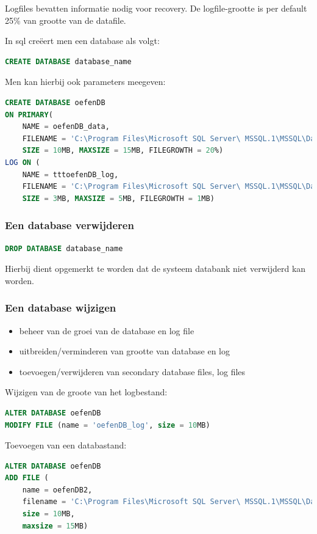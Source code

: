 \documentclass[a4paper,12pt]{article}
\begin{document}
Logfiles bevatten informatie nodig voor recovery.
De logfile-grootte is per default 25\% van grootte van de datafile.

In sql creëert men een database als volgt:
\begin{lstlisting}[language=sql]
CREATE DATABASE database_name
\end{lstlisting}

Men kan hierbij ook parameters meegeven:
\begin{lstlisting}[language=sql, breaklines=true]
CREATE DATABASE oefenDB 
ON PRIMARY(
	NAME = oefenDB_data,
	FILENAME = 'C:\Program Files\Microsoft SQL Server\ MSSQL.1\MSSQL\Data\oefenDB.mdf',
	SIZE = 10MB, MAXSIZE = 15MB, FILEGROWTH = 20%)
LOG ON (
	NAME = tttoefenDB_log,
	FILENAME = 'C:\Program Files\Microsoft SQL Server\ MSSQL.1\MSSQL\Data\oefenDB.ldf',
	SIZE = 3MB, MAXSIZE = 5MB, FILEGROWTH = 1MB)
\end{lstlisting}

\subsubsection{Een database verwijderen}
\begin{lstlisting}[language=sql, breaklines=true]
DROP DATABASE database_name
\end{lstlisting}

Hierbij dient opgemerkt te worden dat de systeem databank niet verwijderd kan worden.

\subsubsection{Een database wijzigen}
\begin{itemize}
\item beheer van de groei van de database en log file
\item uitbreiden/verminderen van grootte van database en log
\item toevoegen/verwijderen van secondary database files, log files
\end{itemize}

Wijzigen van de groote van het logbestand:
\begin{lstlisting}[language=sql, breaklines=true]
ALTER DATABASE oefenDB
MODIFY FILE (name = 'oefenDB_log', size = 10MB)
\end{lstlisting}

Toevoegen van een databastand:
\begin{lstlisting}[language=sql, breaklines=true]
ALTER DATABASE oefenDB
ADD FILE (
	name = oefenDB2,
	filename = 'C:\Program Files\Microsoft SQL Server\ MSSQL.1\MSSQL\Data\oefenDB2.ndf',
	size = 10MB,
	maxsize = 15MB)
\end{lstlisting}
\end{document}
